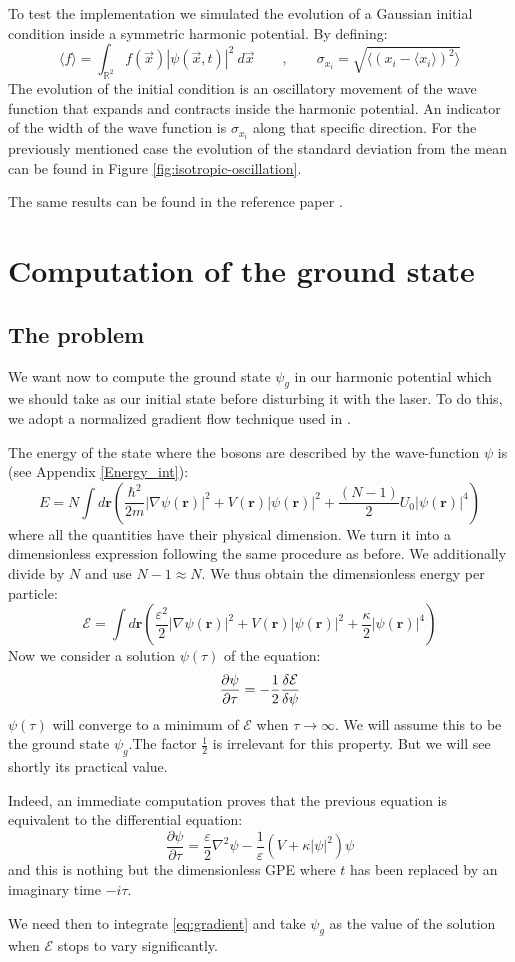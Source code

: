 \documentclass{article}
\begin{document}
To test the implementation we simulated the evolution of a Gaussian initial condition inside a symmetric harmonic potential. By defining:
$$
\langle f\rangle=\int_{\mathbb{R}^2} f(\vec{x}) |\psi(\vec{x},t)|^2 \: d\vec{x} \qquad, \qquad \sigma_{x_i}=\sqrt{\langle(x_i-\langle x_i \rangle)^2\rangle}
$$
The evolution of the initial condition is an oscillatory movement of the wave function that expands and contracts inside the harmonic potential. An indicator of the width of the wave function is $\sigma_{x_i}$ along that specific direction. For the previously mentioned case the evolution of the standard deviation from the mean can be found in Figure \ref{fig:isotropic-oscillation}.

The same results can be found in the reference paper \cite{bao1}.

\section{Computation of the ground state}\label{sec:Ground}
\subsection{The problem}
We want now to compute the ground state $\psi_g$ in our harmonic potential which we should take as our initial state before disturbing it with the laser. To do this, we adopt a normalized gradient flow technique used in \cite{bao2}.

\bigskip
The energy of the state where the bosons are described by the wave-function $\psi$ is (see Appendix \eqref{Energy_int}):
$$E=N\int d\mathbf{r}\left(\frac{\hbar^2}{2m}|\nabla\psi(\mathbf{r})|^2+V(\mathbf{r})|\psi(\mathbf{r})|^2+\frac{(N-1)}{2}U_0|\psi(\mathbf{r})|^4\right)$$
where all the quantities have their physical dimension. We turn it into a dimensionless expression following the same procedure as before. We additionally divide by $N$ and use $N-1\approx N$. We thus obtain the dimensionless energy per particle:
$$\mathcal{E}=\int d\mathbf{r}\left(\frac{\varepsilon^2}{2}|\nabla\psi(\mathbf{r})|^2+V(\mathbf{r})|\psi(\mathbf{r})|^2+\frac{\kappa}{2}|\psi(\mathbf{r})|^4\right)$$
Now we consider a solution $\psi(\tau)$ of the equation:
$$\pdv{\psi}{\tau}=-\frac{1}{2}\frac{\delta\mathcal{E}}{\delta\psi}$$
$\psi(\tau)$ will converge to a minimum of $\mathcal{E}$ when $\tau\longrightarrow \infty$. We will assume this to be the ground state $\psi_g$.The factor $\frac{1}{2}$ is irrelevant for this property. But we will see shortly its practical value.\par
Indeed, an immediate computation proves that the previous equation is equivalent to the differential equation:
\begin{equation}\label{eq:gradient}
   \frac{\partial \psi}{\partial \tau}=\frac{\varepsilon}{2} \nabla^{2} \psi-\frac{1}{\varepsilon}\left(V +\kappa|\psi|^{2}\right) \psi 
\end{equation}
and this is nothing but the dimensionless GPE where $t$ has been replaced by an imaginary time $-i\tau$.\par
We need then to integrate \eqref{eq:gradient} and take $\psi_g$ as the value of the solution when $\mathcal{E}$ stops to vary significantly.
\end{document}
